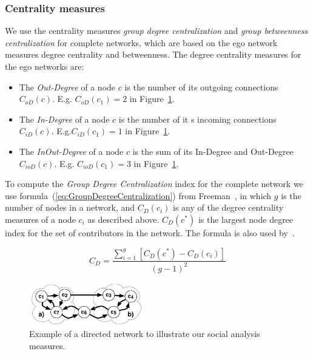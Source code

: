 \documentclass[12pt,oneside]{book}
\begin{document}
\subsubsection{Centrality measures}
We use the centrality measures \emph{group degree centralization} and
\emph{group betweenness centralization} for complete networks, which are based on
the ego network measures degree centrality and betweenness. The degree
centrality measures for the ego networks are:

\begin{itemize}
  \item The \emph{Out-Degree} of a node $c$ is the
  number of its outgoing connections $C_{oD}(c)$. E.g. $C_{oD}(c_1)=2$ in 
  Figure~\ref{fig:CentralityExample}.
  
  \item The \emph{In-Degree} of a node $c$ is the
  number of it s incoming connections $C_{iD}(c)$. E.g.$C_{iD}(c_1)=1$ 
  in Figure~\ref{fig:CentralityExample}.
  
  \item The \emph{InOut-Degree} of a node $c$ is the sum of its In-Degree and
  Out-Degree $C_{ioD}(c)$. E.g. $C_{ioD}(c_1)=3$
  in Figure~\ref{fig:CentralityExample}.
\end{itemize}

To compute the \emph{Group Degree Centralization} index for the complete network
we use formula~(\ref{eq:GroupDegreeCentralization}) from
Freeman~\cite{Freeman:1979rl}, in which $g$ is the number of nodes in a network,
and $C_D(c_i)$ is any of the degree centrality measures of a node $c_i$ as
described above. $C_D(c^*)$ is the largest node degree index for the set of
contributors in the network. The formula is also used
by~\cite{Gloor:2003cikm,hinds:cscw:2006}.

\begin{equation}
\displaystyle C_D =  \frac{\sum_{i=1}^g[C_D(c^*) - C_D(c_i)]}{(g-1)^2}
\label{eq:GroupDegreeCentralization}
\end{equation}

\begin{figure}[t]
\begin{center}
\includegraphics[width=5.0cm]{figures/CentralityExample}
\vspace{-10pt}
\caption{Example of a directed network to illustrate our social
analysis measures.}
\label{fig:CentralityExample}
\end{center}
\end{figure}
\end{document}
